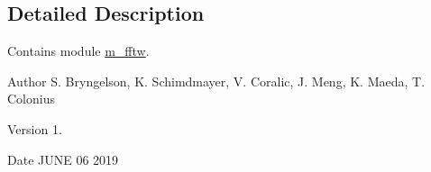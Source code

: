 \subsection{Detailed Description}
Contains module \hyperlink{namespacem__fftw}{m\+\_\+fftw}. 

\begin{DoxyAuthor}{Author}
S. Bryngelson, K. Schimdmayer, V. Coralic, J. Meng, K. Maeda, T. Colonius 
\end{DoxyAuthor}
\begin{DoxyVersion}{Version}
1. 
\end{DoxyVersion}
\begin{DoxyDate}{Date}
J\+U\+NE 06 2019 
\end{DoxyDate}

